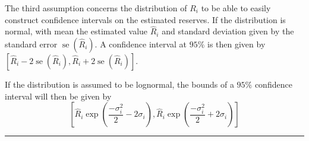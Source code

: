 \begin{f}
%

		

The third assumption concerns the distribution of $R_{i}$ to be able to easily construct confidence intervals on the estimated reserves. If the distribution is normal, with mean the estimated value $\hat{R}_{i}$ and standard deviation given by the standard error $\operatorname{se}\left(\hat{R}_{i}\right)$. A confidence interval at $95 \%$ is then given by $\left[\hat{R}_{i}-2 \operatorname{se}\left(\hat{R}_{i}\right), \hat{R}_{i}+2 \operatorname{se}\left(\hat{R}_{i}\right)\right]$.

If the distribution is assumed to be lognormal, the bounds of a $95\%$ confidence interval will then be given by
$$
\left[\hat{R}_{i} \exp \left(\frac{-\sigma_{i}^{2}}{2}-2 \sigma_{i}\right), \hat{R}_{i} \exp \left(\frac{-\sigma_{i}^{2}}{2}+2 \sigma_{i}\right)\right]
$$
		
\end{f}
\hrule


